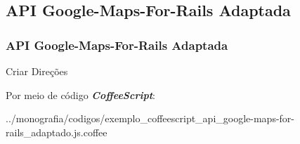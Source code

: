 \subsection{API Google-Maps-For-Rails Adaptada}
\begin{frame}
 \frametitle{API Google-Maps-For-Rails Adaptada}

  \begin{block}{Criar Direções}

   Por meio de código \emph{\textbf{CoffeeScript}}:

      
      {../monografia/codigos/exemplo_coffeescript_api_google-maps-for-rails_adaptado.js.coffee}

  \end{block}

\end{frame}
